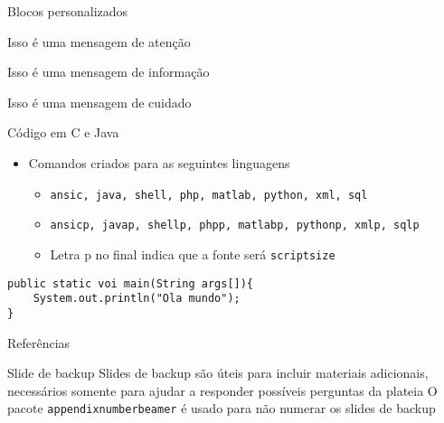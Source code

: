 \documentclass{beamer}
\begin{document}
\begin{frame}[wide]{Blocos personalizados}
\begin{atencao}
    Isso é uma mensagem de atenção
\end{atencao}
\begin{informacao}
    Isso é uma mensagem de informação
\end{informacao}
\begin{cuidado}
    Isso é uma mensagem de cuidado
\end{cuidado}

\end{frame}


\begin{frame}[fragile]{Código em C e Java}

\begin{itemize}
		\item Comandos criados para as seguintes linguagens
		\begin{itemize}
			\item \texttt{ansic, java, shell, php, matlab, python, xml, sql}
			\item \texttt{ansicp, javap, shellp, phpp, matlabp, pythonp, xmlp, sqlp}
			\item Letra p no final indica que a fonte será \texttt{scriptsize}
		\end{itemize}
\end{itemize}



\javap
\begin{lstlisting}
public static voi main(String args[]){
	System.out.println("Ola mundo");
}
\end{lstlisting}		
\end{frame}

\appendix
\begin{frame}{Referências}
    \nocite{*}
    
    
\end{frame}

\begin{frame}{Slide de backup}
    Slides de backup são úteis para incluir materiais adicionais, necessários somente para ajudar a responder possíveis perguntas da plateia
    \vfill
    O pacote \texttt{appendixnumberbeamer} é usado para não numerar os slides de backup
\end{frame}
\end{document}
